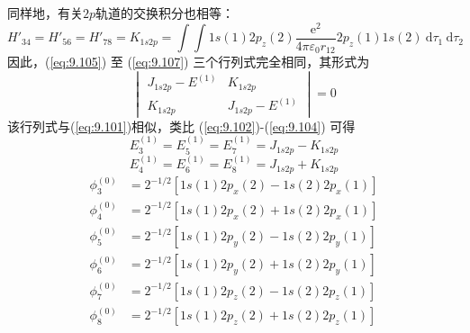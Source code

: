     同样地，有关$2p$轨道的交换积分也相等：
    \begin{equation*}
        H'_{34} = H'_{56} = H'_{78} = K_{1s2p} = \int\int 1s(1)2p_z(2)\frac{\mathrm{e}^2}{4\pi\varepsilon_0 r_{12}}2p_z(1)1s(2)\:\mathrm{d}\tau_1\: \mathrm{d}\tau_2
    \end{equation*}
    因此，(\ref{eq:9.105}) 至 (\ref{eq:9.107}) 三个行列式完全相同，其形式为
    \begin{equation*}
        \begin{vmatrix}
            J_{1s2p} - E^{\left(1\right)} & K_{1s2p} \\
            K_{1s2p} & J_{1s2p} - E^{\left(1\right)}
        \end{vmatrix} = 0
    \end{equation*}
    该行列式与(\ref{eq:9.101})相似，类比 (\ref{eq:9.102})-(\ref{eq:9.104}) 可得
    \begin{equation}
        E_{3}^{\left(1\right)} = E_{5}^{\left(1\right)} = E_7^{\left(1\right)} = J_{1s2p} - K_{1s2p}
        \label{eq:9.108}
    \end{equation}
    \begin{equation}
        E_{4}^{\left(1\right)} = E_{6}^{\left(1\right)} = E_8^{\left(1\right)} = J_{1s2p} + K_{1s2p}
        \label{eq:9.109}
    \end{equation}
    \begin{equation}
        \begin{aligned}
            \phi_3^{\left(0\right)} &= 2^{-1/2}\left[1s\left(1\right)2p_x\left(2\right) - 1s\left(2\right)2p_x\left(1\right)\right] \\
            \phi_4^{\left(0\right)} &= 2^{-1/2}\left[1s\left(1\right)2p_x\left(2\right) + 1s\left(2\right)2p_x\left(1\right)\right] \\
            \phi_5^{\left(0\right)} &= 2^{-1/2}\left[1s\left(1\right)2p_y\left(2\right) - 1s\left(2\right)2p_y\left(1\right)\right] \\
            \phi_6^{\left(0\right)} &= 2^{-1/2}\left[1s\left(1\right)2p_y\left(2\right) + 1s\left(2\right)2p_y\left(1\right)\right] \\
            \phi_7^{\left(0\right)} &= 2^{-1/2}\left[1s\left(1\right)2p_z\left(2\right) - 1s\left(2\right)2p_z\left(1\right)\right] \\
            \phi_8^{\left(0\right)} &= 2^{-1/2}\left[1s\left(1\right)2p_z\left(2\right) + 1s\left(2\right)2p_z\left(1\right)\right]
        \end{aligned}
        \label{eq:9.110}
    \end{equation}

